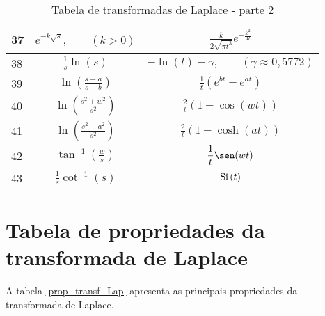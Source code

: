 \begin{table}
\begin{small}
\begin{center}
{{\begin{tabular}{|l|c|c|}
\hline
 37&$\displaystyle e^{-k\sqrt{s}},\qquad (k>0) $&$\displaystyle  \frac{k}{2\sqrt{\pi t^3}}e^{-\frac{k^2}{4t}}$ \\[1ex] 
\hline
 38&$\displaystyle \frac{1}{s}\ln(s)$&$\displaystyle  -\ln(t)-\gamma,\qquad (\gamma\approx 0,5772) $  \\[1ex] 
\hline
 39&$\displaystyle \ln\left(\frac{s-a}{s-b}\right) $&$\displaystyle  \frac{1}{t}\left(e^{bt}-e^{at}\right)$ \\[1ex] 
\hline
 40&$\displaystyle \ln\left(\frac{s^2+w^2}{s^2}\right) $&$\displaystyle  \frac{2}{t}\left(1-\cos(wt)\right)$ \\[1ex] 
\hline
 41&$\displaystyle \ln\left(\frac{s^2-a^2}{s^2}\right)$&$\displaystyle  \frac{2}{t}\left(1-\cosh(at)\right)$ \\[1ex] 
\hline
 42&$\displaystyle \tan^{-1}\left(\frac{w}{s}\right)$&$\displaystyle  \frac{1}{t}\sen(wt)$ \\[1ex] 
\hline
 43&$\displaystyle \frac{1}{s}\cot^{-1}(s) $&$\displaystyle  \hbox{Si}\ \!(t)$ \\[1ex] 
\hline
\end{tabular}}}
\caption{\label{tab_trans_Lap_2}Tabela de transformadas de Laplace - parte 2}
\end{center}
\end{small}
\end{table}

\newpage
\section{Tabela de propriedades da transformada de Laplace}{\label{ap_A2}}
A tabela \ref{prop_transf_Lap} apresenta as principais propriedades da transformada de Laplace.

